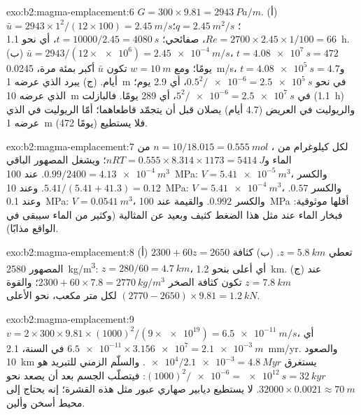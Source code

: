 \begin{solution}{exo:b2:magma-emplacement:6}
$G = 300\times9.81 = \qty{2943}{Pa/m}$. (أ) $\bar u = 2943\times1^2/(12\times100) =
\qty{2.45}{m/s}$؛ $q = \qty{2.45}{m^2/s}$؛ $Re = 2700\times2.45\times1/100 = 66$، صفائحي؛
$t = 10000/2.45 = \qty{4080}{s}$، أي نحو \qty{1.1}{h}. (ب) $\bar u =
2943/(12\times\num{e6}) = \qty{2.45e-4}{m/s}$، $t = \qty{4.08e7}{s} = 472$ يومًا؛ ومع
$w = \qty{10}{m}$ تكون $\bar u$ أكبر بمئة مرة، \qty{0.0245}{m/s}، و$t =
\qty{4.08e5}{s} = 4.7$ أيام. (ج) يبرد  الذي عرضه \qty{1}{m} في نحو
$0.5^2/\num{e-6} = \qty{2.5e5}{s}$، أي 2.9 يوم؛  الذي عرضه \qty{10}{m} في $5^2/\num{e-6} =
\qty{2.5e7}{s}$، أي 289 يومًا. فالبازلت (\qty{1.1}{h}) والريوليت في 
العريض (4.7 أيام) يصلان قبل أن يتجمّد قاطعاهما؛ أمّا الريوليت في
 الذي عرضه \qty{1}{m} (472 يومًا) فلا يستطيع.
\end{solution}

\begin{solution}{exo:b2:magma-emplacement:7}
لكل كيلوغرام من ، $n = 10/18.015 = \qty{0.555}{mol}$ من الماء و$nRT =
0.555\times8.314\times1173 = \qty{5414}{J}$؛ ويشغل المصهور الباقي $0.99/2400 =
\qty{4.13e-4}{m^3}$. عند \qty{100}{MPa}: $V = \qty{5.41e-5}{m^3}$، والكسر
$5.41/(5.41 + 41.3) = 0.12$. وعند \qty{10}{MPa}: $V = \qty{5.41e-4}{m^3}$، والكسر
$0.57$. وعند \qty{0.1}{MPa}: $V = \qty{0.0541}{m^3}$، والكسر $0.992$. والقيمة عند
\qty{100}{MPa} أقلها موثوقية: فبخار الماء عند مثل هذا الضغط كثيف
وبعيد عن المثالية (وكثير من الماء سيبقى في الواقع مذابًا).
\end{solution}

\begin{solution}{exo:b2:magma-emplacement:8}
(أ) $2300 + 60z = 2650$ تعطي $z = \qty{5.8}{km}$. (ب) كثافة المصهور
\qty{2580}{kg/m^3}: $z = 280/60 = \qty{4.7}{km}$، أي أعلى بنحو \qty{1.2}{km}. (ج)
عند $z = \qty{7.8}{km}$ تكون كثافة الصخر $2300 + 60\times7.8 = \qty{2770}{kg/m^3}$؛
والقوة $(2770 - 2650)\times9.81 = \qty{1.2}{kN}$ لكل متر مكعب، نحو الأعلى.
\end{solution}

\begin{solution}{exo:b2:magma-emplacement:9}
$v = 2\times300\times9.81\times(1000)^2/(9\times\num{e19}) = \qty{6.5e-11}{m/s}$، أي
$\num{6.5e-11}\times\num{3.156e7} = \qty{2.1e-3}{m}$ في السنة، \qty{2.1}{mm/yr}. والصعود
\qty{10}{km} يستغرق $\num{e4}/\num{2.1e-3} = \qty{4.8}{Myr}$. والسلّم الزمني للتبريد
هو $(1000)^2/\num{e-6} = \qty{e12}{s} = \qty{32}{kyr}$: فيتصلّب الجسم بعد
أن يصعد نحو $32000\times0.0021 \approx \qty{70}{m}$. لا يستطيع ديابير صهاري عبور
مثل هذه القشرة؛ إنه يحتاج إلى محيط أسخن وألين.
\end{solution}

